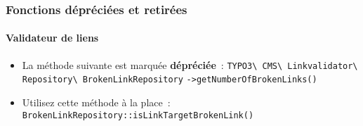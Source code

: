 %
%
%
%
%
%
%
%
%

\begin{frame}[fragile]
	\frametitle{Fonctions dépréciées et retirées}
	\framesubtitle{Validateur de liens}

	\begin{itemize}
		\item La méthode suivante est marquée \textbf{dépréciée}~:
		\newline\newline
			\smaller
				\texttt{TYPO3\textbackslash
					CMS\textbackslash
					Linkvalidator\textbackslash
					Repository\textbackslash
					BrokenLinkRepository}\newline
				\texttt{->getNumberOfBrokenLinks()}\normalsize\newline

		\item Utilisez cette méthode à la place~:\newline
			\small\texttt{BrokenLinkRepository::isLinkTargetBrokenLink()}\normalsize

	\end{itemize}

\end{frame}


